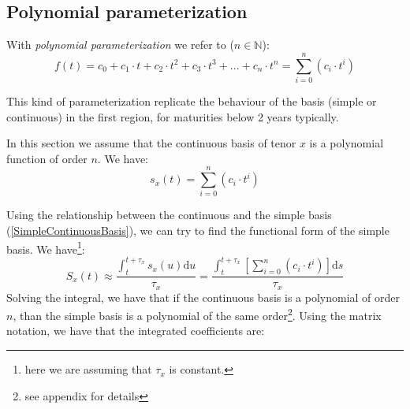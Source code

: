 \documentclass{article}
\begin{document}
\begin{appendices}
\label{app:Polynomial parameterization}
\subsection{Polynomial parameterization} 
With \textit{polynomial parameterization} we refer to ($ n \in \mathbb{N}$):
\begin{equation}
f(t) = c_0 + c_1\cdot t + c_2\cdot t^2 + c_3\cdot t^3 + ... + c_n\cdot t^n = \sum_{i=0}^{n}(c_i \cdot t^i)
\end{equation}

This kind of parameterization replicate the behaviour of the basis (simple or continuous) in the first region, for maturities below 2 years typically.

In this section we assume that the continuous basis of tenor $x$ is a polynomial function of order $n$. We have:
\begin{equation}
s_x(t) = \sum_{i=0}^{n}(c_i \cdot t^i)
\end{equation}

Using the relationship between the continuous and the simple basis (\ref{SimpleContinuousBasis}), we can try to find the functional form of the simple basis. We have\footnote{here we are assuming that $\tau_x$ is constant.}:
\begin{equation}
S_x(t) \approx \frac{\int_t^{t+\tau_x} s_x(u) \mathrm{d}u}{\tau_x} = \frac{\int_t^{t+\tau_x} [\sum_{i=0}^{n}(c_i \cdot t^i)] \mathrm{d}s}{\tau_x}
\end{equation}
Solving the integral, we have that if the continuous basis is a polynomial of order $n$, than the simple basis is a polynomial of the same order\footnote{see appendix for details}.
Using the matrix notation, we have that the integrated coefficients are:


\end{appendices}
\end{document}
